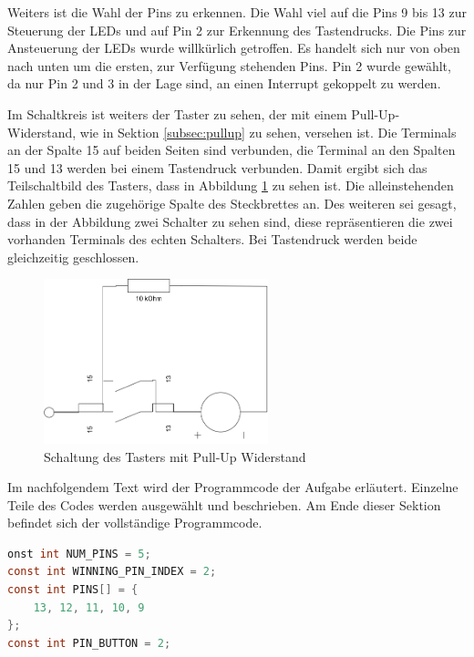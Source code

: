 Weiters ist die Wahl der Pins zu erkennen.
Die Wahl viel auf die Pins 9 bis 13 zur Steuerung der LEDs und auf Pin 2 zur Erkennung des Tastendrucks.
Die Pins zur Ansteuerung der LEDs wurde willkürlich getroffen.
Es handelt sich nur von oben nach unten um die ersten, zur Verfügung stehenden Pins.
Pin 2 wurde gewählt, da nur Pin 2 und 3 in der Lage sind, an einen Interrupt gekoppelt zu werden.

\newpage

Im Schaltkreis ist weiters der Taster zu sehen, der mit einem Pull-Up-Widerstand, wie in Sektion \ref{subsec:pullup} zu sehen, versehen ist.
Die Terminals an der Spalte 15 auf beiden Seiten sind verbunden, die Terminal an den Spalten 15 und 13 werden bei einem Tastendruck verbunden.
Damit ergibt sich das Teilschaltbild des Tasters, dass in Abbildung \ref{fig:schaltung-taster-pull-up} zu sehen ist.
Die alleinstehenden Zahlen geben die zugehörige Spalte des Steckbrettes an.
Des weiteren sei gesagt, dass in der Abbildung zwei Schalter zu sehen sind, diese repräsentieren die zwei vorhanden Terminals des echten Schalters.
Bei Tastendruck werden beide gleichzeitig geschlossen.

\begin{figure}[h]
    \centering
    \includegraphics[width=0.58\textwidth]{pictures/a2-taster.png}
    \caption{Schaltung des Tasters mit Pull-Up Widerstand}
    \label{fig:schaltung-taster-pull-up}
\end{figure}

Im nachfolgendem Text wird der Programmcode der Aufgabe erläutert.
Einzelne Teile des Codes werden ausgewählt und beschrieben.
Am Ende dieser Sektion befindet sich der vollständige Programmcode.

\begin{lstlisting}[language=C,label={lst:a2-const-pin}, caption={Setzen der Pin-Konstanten}]
onst int NUM_PINS = 5;
const int WINNING_PIN_INDEX = 2;
const int PINS[] = {
	13, 12, 11, 10, 9
};
const int PIN_BUTTON = 2;
\end{lstlisting}

